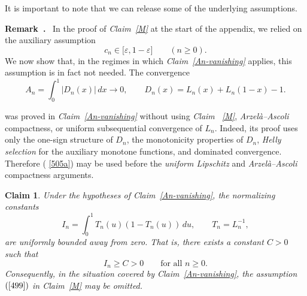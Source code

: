 \documentclass[onecolumn]{article}
\newtheorem{claim}[theorem]{Claim}
\newenvironment{remark}{  \refstepcounter{theorem}  \par\medskip\noindent\textbf{Remark~\thetheorem.}\rmfamily\ }{\par\medskip}
\begin{document}
It is important to note that we can release some of the underlying
assumptions.

\begin{remark}
\noindent \textbf{\label{endpoint-separation-release} }In the proof of 
\textit{Claim~\ref{M}} at the start of the appendix, we relied on the
auxiliary assumption 
\begin{equation*}
c_{n}\in \lbrack \varepsilon ,1-\varepsilon ]\qquad (n\geq 0).
\end{equation*}%
We now show that, in the regimes in which \textit{Claim~\ref{An-vanishing}}
applies, this assumption is in fact not needed. The convergence%
\begin{equation}
A_{n}=\int_{0}^{1}|D_{n}(x)|\,dx\longrightarrow 0,\qquad
D_{n}(x)=L_{n}(x)+L_{n}(1-x)-1.  \label{505a}
\end{equation}

was proved in \textit{Claim~\ref{An-vanishing}} without using \textit{Claim~%
\ref{M}}, \textit{Arzel\`{a}--Ascoli} compactness, or uniform subsequential
convergence of $L_{n}$. Indeed, its proof uses only the one-sign structure
of $D_{n}$, the monotonicity properties of $D_{n}$, \textit{Helly selection}
for the auxiliary monotone functions, and dominated convergence. Therefore (%
\ref{505a}) may be used before the \textit{uniform Lipschitz} and \textit{%
Arzel\`{a}--Ascoli} compactness arguments.
\end{remark}

\begin{claim}
\noindent \textbf{\label{In-noncollapse-from-An} }Under the hypotheses of
Claim~\ref{An-vanishing}, the normalizing constants 
\begin{equation}
I_{n}=\int_{0}^{1}T_{n}(u)(1-T_{n}(u))\,du,\qquad T_{n}=L_{n}^{-1},
\label{505c}
\end{equation}%
are uniformly bounded away from zero. That is, there exists a constant $C>0$
such that 
\begin{equation}
I_{n}\geq C>0\qquad \text{for all }n\geq 0.  \label{505d}
\end{equation}%
Consequently, in the situation covered by Claim~\ref{An-vanishing}, the
assumption $(\ref{499})$ in Claim~\ref{M} may be omitted.
\end{claim}
\end{document}
